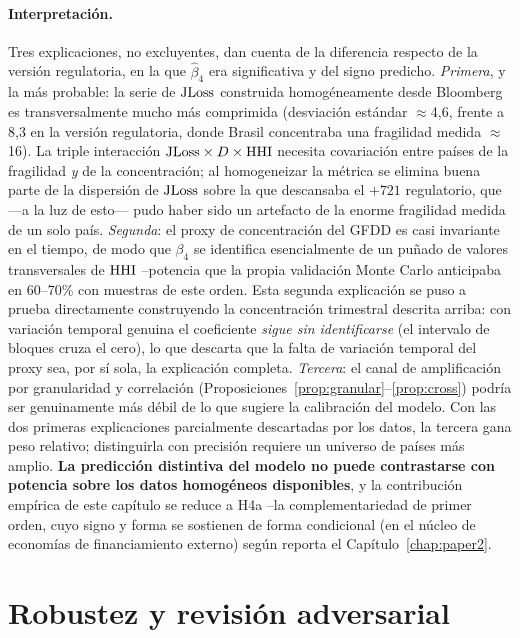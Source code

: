 \paragraph{Interpretación.} Tres explicaciones, no excluyentes, dan cuenta de la diferencia respecto de la versión regulatoria, en la que $\hat\beta_4$ era significativa y del signo predicho. \emph{Primera}, y la más probable: la serie de $\mathrm{JLoss}$ construida homogéneamente desde Bloomberg es transversalmente mucho más comprimida (desviación estándar $\approx$4,6, frente a 8,3 en la versión regulatoria, donde Brasil concentraba una fragilidad medida $\approx$16). La triple interacción $\mathrm{JLoss}\times D\times\mathrm{HHI}$ necesita covariación entre países de la fragilidad \emph{y} de la concentración; al homogeneizar la métrica se elimina buena parte de la dispersión de $\mathrm{JLoss}$ sobre la que descansaba el $+721$ regulatorio, que —a la luz de esto— pudo haber sido un artefacto de la enorme fragilidad medida de un solo país. \emph{Segunda}: el proxy de concentración del GFDD es casi invariante en el tiempo, de modo que $\beta_4$ se identifica esencialmente de un puñado de valores transversales de $\mathrm{HHI}$ --potencia que la propia validación Monte Carlo anticipaba en 60--70\% con muestras de este orden. Esta segunda explicación se puso a prueba directamente construyendo la concentración trimestral descrita arriba: con variación temporal genuina el coeficiente \emph{sigue sin identificarse} (el intervalo de bloques cruza el cero), lo que descarta que la falta de variación temporal del proxy sea, por sí sola, la explicación completa. \emph{Tercera}: el canal de amplificación por granularidad y correlación (Proposiciones~\ref{prop:granular}--\ref{prop:cross}) podría ser genuinamente más débil de lo que sugiere la calibración del modelo. Con las dos primeras explicaciones parcialmente descartadas por los datos, la tercera gana peso relativo; distinguirla con precisión requiere un universo de países más amplio. \textbf{La predicción distintiva del modelo no puede contrastarse con potencia sobre los datos homogéneos disponibles}, y la contribución empírica de este capítulo se reduce a H4a --la complementariedad de primer orden, cuyo signo y forma se sostienen de forma condicional (en el núcleo de economías de financiamiento externo) según reporta el Capítulo~\ref{chap:paper2}.

\section{Robustez y revisión adversarial}\label{sec:robustez}

